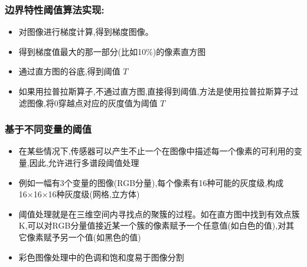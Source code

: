 \documentclass{beamer}
\begin{document}
\begin{frame}
\frametitle{边界特性阈值算法实现:}
\label{sec-4-11}

\begin{itemize}
\item 对图像进行梯度计算,得到梯度图像。
\item 得到梯度值最大的那一部分(比如10\%)的像素直方图
\item 通过直方图的谷底,得到阈值 $T$
\item 如果用拉普拉斯算子,不通过直方图,直接得到阈值,方法是使用拉普拉斯算子过滤图像,将0穿越点对应的灰度值为阈值 $T$
\end{itemize}
\end{frame}
\begin{frame}
\frametitle{基于不同变量的阈值}
\label{sec-4-12}

\begin{itemize}
\item 在某些情况下,传感器可以产生不止一个在图像中描述每一个像素的可利用的变量,因此,允许进行多谱段阈值处理
\item 例如一幅有3个变量的图像(RGB分量),每个像素有16种可能的灰度级,构成16×16×16种灰度级(网格,立方体)
\item 阈值处理就是在三维空间内寻找点的聚簇的过程。如在直方图中找到有效点簇K,可以对RGB分量值接近某一个簇的像素赋予一个任意值(如白色的值),对其它像素赋予另一个值(如黑色的值)
\item 彩色图像处理中的色调和饱和度易于图像分割
\end{itemize}
\end{frame}
\end{document}

